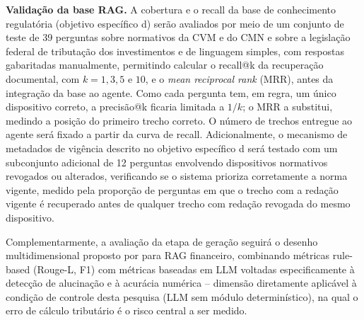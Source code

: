 \textbf{Valida\c{c}\~ao da base RAG.} A cobertura e o recall da base de
conhecimento regulat\'oria (objetivo espec\'ifico d) ser\~ao avaliados por
meio de um conjunto de teste de 39 perguntas sobre normativos da CVM e
do CMN e sobre a legisla\c{c}\~ao federal de tributa\c{c}\~ao dos
investimentos e de linguagem simples, com respostas gabaritadas
manualmente, permitindo
calcular o recall@k da recupera\c{c}\~ao documental, com $k = 1, 3, 5$ e
$10$, e o \textit{mean reciprocal rank} (MRR), antes da
integra\c{c}\~ao da base ao agente. Como cada pergunta tem, em regra, um
\'unico dispositivo correto, a precis\~ao@k ficaria limitada a $1/k$; o
MRR a substitui, medindo a posi\c{c}\~ao do primeiro trecho correto. O
n\'umero de trechos entregue ao agente ser\'a fixado a partir da curva
de recall. Adicionalmente, o mecanismo de
metadados de vig\^encia descrito no objetivo espec\'ifico d ser\'a testado
com um subconjunto adicional de 12 perguntas envolvendo dispositivos normativos
revogados ou alterados, verificando se o sistema prioriza corretamente a
norma vigente, medido pela propor\c{c}\~ao de perguntas em que o trecho
com a reda\c{c}\~ao vigente \'e recuperado antes de qualquer trecho com
reda\c{c}\~ao revogada do mesmo dispositivo.

Complementarmente, a avalia\c{c}\~ao da etapa de gera\c{c}\~ao seguir\'a o
desenho multidimensional proposto por \textcite{wang2025omnieval} para RAG
financeiro, combinando m\'etricas rule-based (Rouge-L, F1) com m\'etricas
baseadas em LLM voltadas especificamente \`a detec\c{c}\~ao de
alucina\c{c}\~ao e \`a acur\'acia num\'erica -- dimens\~ao diretamente
aplic\'avel \`a condi\c{c}\~ao de controle desta pesquisa (LLM sem m\'odulo
determin\'istico), na qual o erro de c\'alculo tribut\'ario \'e o risco
central a ser medido.

